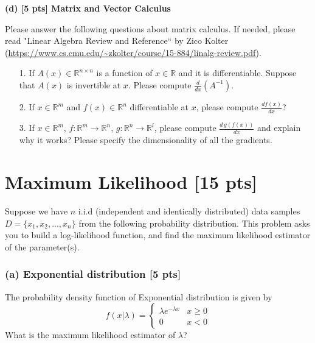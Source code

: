 \documentclass[twoside,10pt]{article}
\begin{document}
\noindent\textbf{(d) [5 pts] Matrix and Vector Calculus}

Please answer the following questions about matrix calculus. If needed, please read "Linear Algebra Review and Reference`` by Zico Kolter (\url{https://www.cs.cmu.edu/~zkolter/course/15-884/linalg-review.pdf}).
\begin{enumerate}
    \item[1.] If \( A(x) \in \mathbb{R}^{n \times n} \) is a function of \( x \in \mathbb{R} \) and it is differentiable. Suppose that \( A(x) \) is invertible at $x$. Please compute \( \frac{d}{dx} \left( A^{-1} \right) \).

    \item[2.] If \( x \in \mathbb{R}^m \) and \( f(x) \in \mathbb{R}^n \) differentiable at $x$, please compute \( \frac{df(x)}{dx} \)?

    \item[3.] If \( x \in \mathbb{R}^m \), \( f: \mathbb{R}^m \to \mathbb{R}^n \), \( g: \mathbb{R}^n \to \mathbb{R}^l \), please compute \( \frac{d \, g(f(x))}{dx} \) and explain why it works? Please specify the dimensionality of all the gradients.
\end{enumerate}



\section{Maximum Likelihood [15 pts]}

Suppose we have $n$ i.i.d (independent and identically distributed)
data samples $D = \{ x_1, x_2, ...,x_n \}$ from the following probability distribution. This
problem asks you to build a log-likelihood function, and find the
maximum likelihood estimator of the parameter(s).

\subsubsection*{(a) Exponential distribution [5 pts]}
The probability density function of Exponential distribution is
given by
\begin{equation} \nonumber
f(x | \lambda) = \left\{\begin{matrix}
\lambda e^{-\lambda x} & x \ge 0\\
0 & x < 0
\end{matrix}\right.
\end{equation}
What is the maximum likelihood estimator of $\lambda$?
\end{document}
